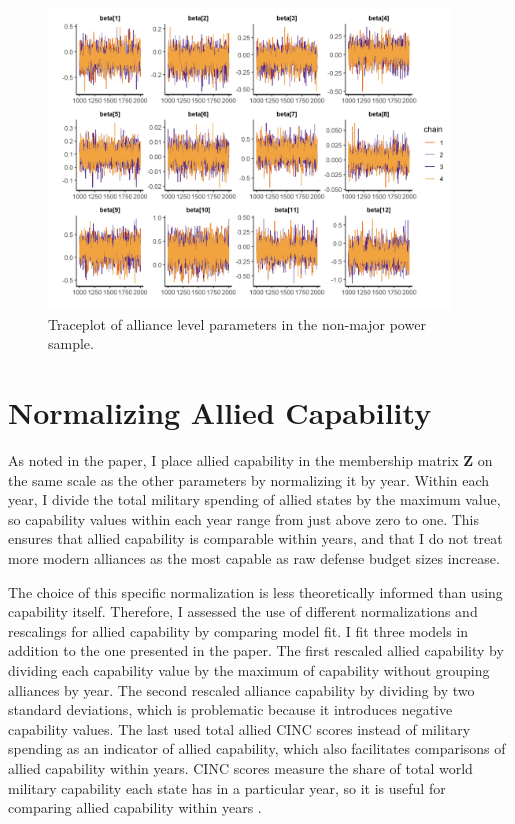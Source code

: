 \documentclass[12pt]{article}
\begin{document}
\begin{figure}[htbp]
	\centering
		\includegraphics[width=0.95\textwidth]{trace-all-min.png}
	\caption{Traceplot of alliance level parameters in the non-major power sample.}
	\label{fig:trace-all-min}
\end{figure}



\section{Normalizing Allied Capability}

As noted in the paper, I place allied capability in the membership matrix \textbf{Z} on the same scale as the other parameters by normalizing it by year. 
Within each year, I divide the total military spending of allied states by the maximum value, so capability values within each year range from just above zero to one. 
This ensures that allied capability is comparable within years, and that I do not treat more modern alliances as the most capable as raw defense budget sizes increase. 


The choice of this specific normalization is less theoretically informed than using capability itself. 
Therefore, I assessed the use of different normalizations and rescalings for allied capability by comparing model fit. 
I fit three models in addition to the one presented in the paper. 
The first rescaled allied capability by dividing each capability value by the maximum of capability without grouping alliances by year. 
The second rescaled alliance capability by dividing by two standard deviations, which is problematic because it introduces negative capability values. 
The last used total allied CINC scores instead of military spending as an indicator of allied capability, which also facilitates comparisons of allied capability within years. 
CINC scores measure the share of total world military capability each state has in a particular year, so it is useful for comparing allied capability within years \citep{SingerCINC1988}. 
\end{document}

